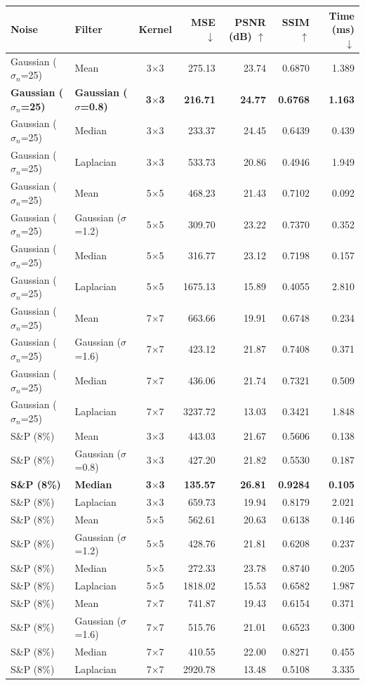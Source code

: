 \begin{tabular}{llcrrrr}
\toprule
Noise & Filter & Kernel & MSE $\downarrow$ & PSNR (dB) $\uparrow$ & SSIM $\uparrow$ & Time (ms) $\downarrow$ \\
\midrule
Gaussian ($\sigma_n$=25) & Mean & 3$\times$3 & 275.13 & 23.74 & 0.6870 & 1.389 \\
\textbf{Gaussian ($\sigma_n$=25)} & \textbf{Gaussian ($\sigma$=0.8)} & \textbf{3$\times$3} & \textbf{216.71} & \textbf{24.77} & \textbf{0.6768} & \textbf{1.163} \\
Gaussian ($\sigma_n$=25) & Median & 3$\times$3 & 233.37 & 24.45 & 0.6439 & 0.439 \\
Gaussian ($\sigma_n$=25) & Laplacian & 3$\times$3 & 533.73 & 20.86 & 0.4946 & 1.949 \\
\midrule
Gaussian ($\sigma_n$=25) & Mean & 5$\times$5 & 468.23 & 21.43 & 0.7102 & 0.092 \\
Gaussian ($\sigma_n$=25) & Gaussian ($\sigma$=1.2) & 5$\times$5 & 309.70 & 23.22 & 0.7370 & 0.352 \\
Gaussian ($\sigma_n$=25) & Median & 5$\times$5 & 316.77 & 23.12 & 0.7198 & 0.157 \\
Gaussian ($\sigma_n$=25) & Laplacian & 5$\times$5 & 1675.13 & 15.89 & 0.4055 & 2.810 \\
\midrule
Gaussian ($\sigma_n$=25) & Mean & 7$\times$7 & 663.66 & 19.91 & 0.6748 & 0.234 \\
Gaussian ($\sigma_n$=25) & Gaussian ($\sigma$=1.6) & 7$\times$7 & 423.12 & 21.87 & 0.7408 & 0.371 \\
Gaussian ($\sigma_n$=25) & Median & 7$\times$7 & 436.06 & 21.74 & 0.7321 & 0.509 \\
Gaussian ($\sigma_n$=25) & Laplacian & 7$\times$7 & 3237.72 & 13.03 & 0.3421 & 1.848 \\
\midrule
S\&P (8\%) & Mean & 3$\times$3 & 443.03 & 21.67 & 0.5606 & 0.138 \\
S\&P (8\%) & Gaussian ($\sigma$=0.8) & 3$\times$3 & 427.20 & 21.82 & 0.5530 & 0.187 \\
\textbf{S\&P (8\%)} & \textbf{Median} & \textbf{3$\times$3} & \textbf{135.57} & \textbf{26.81} & \textbf{0.9284} & \textbf{0.105} \\
S\&P (8\%) & Laplacian & 3$\times$3 & 659.73 & 19.94 & 0.8179 & 2.021 \\
\midrule
S\&P (8\%) & Mean & 5$\times$5 & 562.61 & 20.63 & 0.6138 & 0.146 \\
S\&P (8\%) & Gaussian ($\sigma$=1.2) & 5$\times$5 & 428.76 & 21.81 & 0.6208 & 0.237 \\
S\&P (8\%) & Median & 5$\times$5 & 272.33 & 23.78 & 0.8740 & 0.205 \\
S\&P (8\%) & Laplacian & 5$\times$5 & 1818.02 & 15.53 & 0.6582 & 1.987 \\
\midrule
S\&P (8\%) & Mean & 7$\times$7 & 741.87 & 19.43 & 0.6154 & 0.371 \\
S\&P (8\%) & Gaussian ($\sigma$=1.6) & 7$\times$7 & 515.76 & 21.01 & 0.6523 & 0.300 \\
S\&P (8\%) & Median & 7$\times$7 & 410.55 & 22.00 & 0.8271 & 0.455 \\
S\&P (8\%) & Laplacian & 7$\times$7 & 2920.78 & 13.48 & 0.5108 & 3.335 \\
\bottomrule
\end{tabular}
